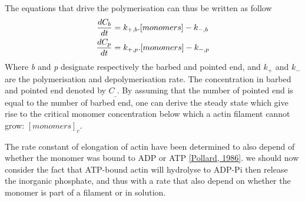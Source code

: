 \documentclass[A4paperpaper,11pt,english]{sphinxmanual}
\begin{document}
The equations that drive the polymerisation can thus be written as follow
\begin{gather}
\begin{split}\frac{dC_b}{dt} &= k_{+,b}.[monomers] - k_{-,b} \\
\frac{dC_p}{dt} &= k_{+,p}.[monomers] - k_{-,p} \\\end{split}\notag
\end{gather}
Where \emph{b} and \emph{p} designate respectively the barbed and pointed end, and
\(k_+\) and \(k_-\) are the polymerisation and depolymerisation rate.
The concentration in barbed and pointed end denoted by \(C_\_\). By
assuming that the number of pointed end is equal to the number of barbed end,
one can derive the steady state which give rise to the critical monomer
concentration below which a actin filament cannot grow: \([monomers]_c\).

The rate constant of elongation of actin have been determined to also depend of
whether the monomer was bound to ADP or ATP {\hyperref[bibitem:pollard1986]{{[}Pollard,  1986{]}}}. we should now
consider the fact that ATP-bound actin will hydrolyse to ADP-Pi then release
the inorganic phosphate, and thus with a rate that also depend on whether the
monomer is part of a filament or in solution.
\end{document}
